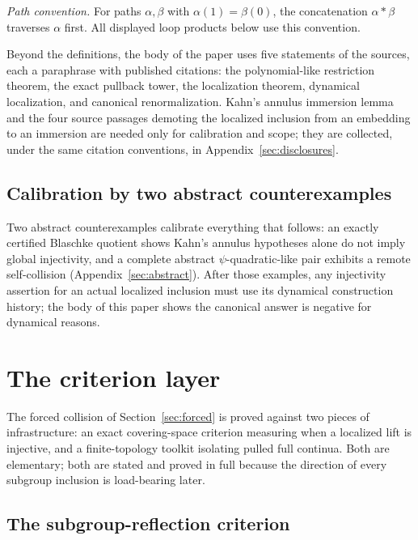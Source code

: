 \documentclass[11pt,reqno]{amsart}
\theoremstyle{definition}
\theoremstyle{remark}
\begin{document}
\emph{Path convention.}  For paths $\alpha,\beta$ with
$\alpha(1)=\beta(0)$, the concatenation $\alpha*\beta$ traverses
$\alpha$ first.  All displayed loop products below use this
convention.


Beyond the definitions, the body of the paper uses five statements of
the sources, each a paraphrase with published citations: the
polynomial-like restriction theorem, the exact pullback tower, the
localization theorem, dynamical localization, and canonical
renormalization.  Kahn's annulus immersion lemma and the four source
passages demoting the localized inclusion from an embedding to an
immersion are needed only for calibration and scope; they are
collected, under the same citation conventions, in
Appendix~\ref{sec:disclosures}.


\subsection*{Calibration by two abstract counterexamples}
Two abstract counterexamples calibrate everything that follows: an
exactly certified Blaschke quotient shows Kahn's annulus hypotheses
alone do not imply global injectivity, and a complete abstract
$\psi$-quadratic-like pair exhibits a remote self-collision
(Appendix~\ref{sec:abstract}).  After those examples, any injectivity
assertion for an actual localized inclusion must use its dynamical
construction history; the body of this paper shows the canonical
answer is negative for dynamical reasons.

\section{The criterion layer}
\label{sec:criteria}

The forced collision of Section~\ref{sec:forced} is proved against two
pieces of infrastructure: an exact covering-space criterion measuring
when a localized lift is injective, and a finite-topology toolkit
isolating pulled full continua.  Both are elementary; both are stated
and proved in full because the direction of every subgroup inclusion is
load-bearing later.

\subsection{The subgroup-reflection criterion}
\end{document}
